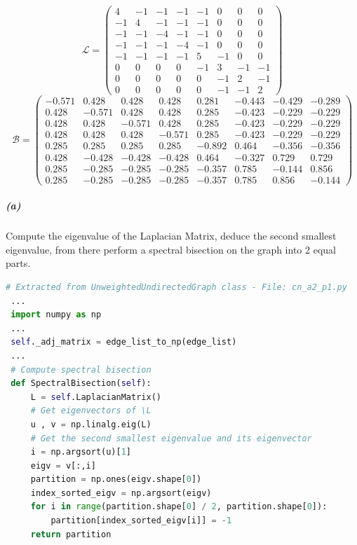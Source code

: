 \documentclass[a4paper,12pt]{article}
\begin{document}
\[ \mathcal{L} = \left( \begin{array}{cccccccc}
4 & -1 & -1 & -1 & -1 & 0 & 0 & 0 \\
-1 & 4 & -1 & -1 & -1 & 0 & 0 & 0 \\
-1 & -1 & -4 & -1 & -1 & 0 & 0 & 0 \\
-1 & -1 & -1 & -4 & -1 & 0 & 0 & 0 \\
-1 & -1 & -1 & -1 & 5 & -1 & 0 & 0 \\
0 & 0 & 0 & 0 & -1 & 3 & -1 & -1 \\
0 & 0 & 0 & 0 & 0 & -1 & 2 & -1 \\
0 & 0 & 0 & 0 & 0 & -1 & -1 & 2 \end{array} \right) \]
\[ \mathcal{B} = \left( \begin{array}{cccccccc}
-0.571 & 0.428 & 0.428 & 0.428 & 0.281 & -0.443 & -0.429 & -0.289 \\
0.428 & -0.571 &  0.428 &  0.428 &  0.285 & -0.423 & -0.229 & -0.229 \\
0.428 &  0.428 & -0.571 &  0.428 &  0.285 & -0.423 & -0.229 & -0.229 \\
0.428 &  0.428 &  0.428 & -0.571 &  0.285 & -0.423 & -0.229 & -0.229 \\
0.285 &  0.285 &  0.285 &  0.285 & -0.892 & 0.464 & -0.356 & -0.356 \\
0.428 & -0.428 & -0.428 & -0.428 &  0.464 & -0.327 &  0.729 &  0.729 \\
0.285 & -0.285 & -0.285 & -0.285 & -0.357 & 0.785 & -0.144 &  0.856 \\
0.285 & -0.285 & -0.285 & -0.285 & -0.357 & 0.785 &  0.856 & -0.144 \end{array} \right)\]

\subparagraph{(a)} Compute the eigenvalue of the Laplacian Matrix, deduce the second smallest eigenvalue, from there perform a spectral bisection on the graph into 2 equal parts.

\begin{lstlisting}[language=Python, caption={Perform Spectral Bisection on the graph}, label={lst:bisec}]
 # Extracted from UnweightedUndirectedGraph class - File: cn_a2_p1.py
 ...
 import numpy as np
 ...
 self._adj_matrix = edge_list_to_np(edge_list)
 ...
 # Compute spectral bisection
 def SpectralBisection(self):
     L = self.LaplacianMatrix()
     # Get eigenvectors of \L
     u , v = np.linalg.eig(L)
     # Get the second smallest eigenvalue and its eigenvector
     i = np.argsort(u)[1]
     eigv = v[:,i]
     partition = np.ones(eigv.shape[0])
     index_sorted_eigv = np.argsort(eigv)
     for i in range(partition.shape[0] / 2, partition.shape[0]):
         partition[index_sorted_eigv[i]] = -1
     return partition
\end{lstlisting}
\end{document}
